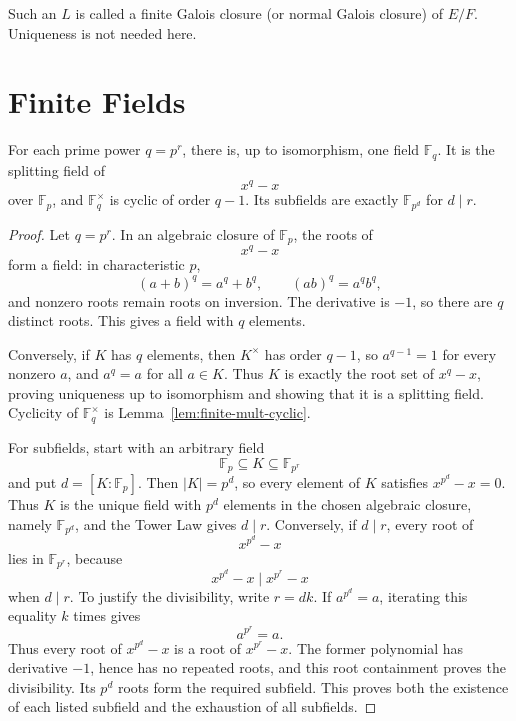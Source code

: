 Such an \(L\) is called a finite Galois closure (or normal Galois closure)
of \(E/F\).  Uniqueness is not needed here.

\section{Finite Fields}
\begin{theorem}\label{thm:finite-fields}
For each prime power \(q=p^r\), there is, up to isomorphism, one field
\(\mathbb F_q\).  It is the splitting field of
\[
x^q-x
\]
over \(\mathbb F_p\), and \(\mathbb F_q^\times\) is cyclic of order \(q-1\).
Its subfields are exactly \(\mathbb F_{p^d}\) for \(d\mid r\).
\end{theorem}
\begin{proof}
Let \(q=p^r\).  In an algebraic closure of \(\mathbb F_p\), the roots of
\[
x^q-x
\]
form a field: in characteristic \(p\),
\[
(a+b)^q=a^q+b^q,\qquad(ab)^q=a^qb^q,
\]
and nonzero roots remain roots on inversion.  The derivative is \(-1\), so
there are \(q\) distinct roots.  This gives a field with \(q\) elements.

Conversely, if \(K\) has \(q\) elements, then \(K^\times\) has order \(q-1\),
so \(a^{q-1}=1\) for every nonzero \(a\), and \(a^q=a\) for all \(a\in K\).
Thus \(K\) is exactly the root set of \(x^q-x\), proving uniqueness up to
isomorphism and showing that it is a splitting field.  Cyclicity of
\(\mathbb F_q^\times\) is Lemma~\ref{lem:finite-mult-cyclic}.

For subfields, start with an arbitrary field
\[
\mathbb F_p\subseteq K\subseteq\mathbb F_{p^r}
\]
and put \(d=[K:\mathbb F_p]\).  Then \(|K|=p^d\), so every element of \(K\)
satisfies \(x^{p^d}-x=0\).  Thus \(K\) is the unique field with \(p^d\)
elements in the chosen algebraic closure, namely \(\mathbb F_{p^d}\), and
the Tower Law gives \(d\mid r\).  Conversely, if \(d\mid r\), every root of
\[
x^{p^d}-x
\]
lies in \(\mathbb F_{p^r}\), because
\[
x^{p^d}-x\mid x^{p^r}-x
\]
when \(d\mid r\).  To justify the divisibility, write \(r=dk\).  If
\(a^{p^d}=a\), iterating this equality \(k\) times gives
\[
a^{p^r}=a.
\]
Thus every root of \(x^{p^d}-x\) is a root of \(x^{p^r}-x\).  The former
polynomial has derivative \(-1\), hence has no repeated roots, and this
root containment proves the divisibility.  Its \(p^d\) roots form the
required subfield.  This proves both the existence of each listed subfield
and the exhaustion of all subfields.
\end{proof}

